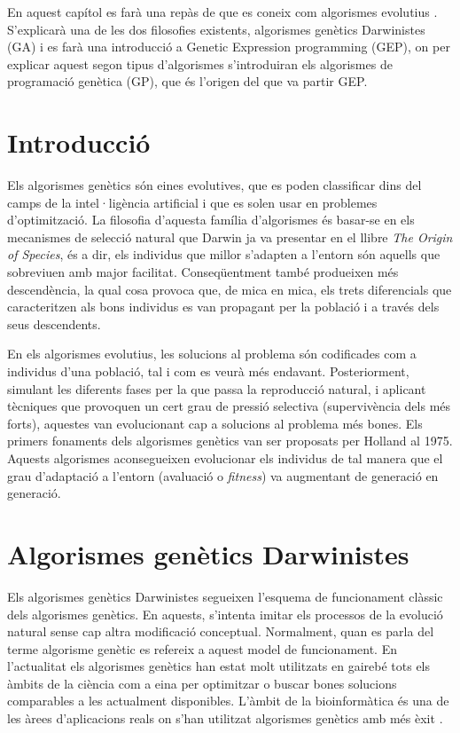 %


En aquest capítol es farà una repàs de que es coneix com algorismes evolutius
\cite{H75}. S'explicarà una de les dos filosofies existents,
algorismes genètics Darwinistes (GA) i es farà una introducció a Genetic
Expression programming (GEP), on per explicar aquest segon tipus d'algorismes
s'introduiran els algorismes de programació genètica (GP), que és l'origen del
que va partir GEP.

\section{Introducció}
Els algorismes genètics són eines evolutives, que es poden
classificar dins del camps de la intel·ligència artificial i que es solen usar
en problemes d'optimització. La filosofia d'aquesta família d'algorismes és
basar-se en els mecanismes de selecció natural que Darwin ja va presentar en el
llibre \emph{The Origin of Species}, és a dir, els individus que millor
s'adapten a l'entorn són aquells que sobreviuen amb major facilitat.
Conseqüentment també produeixen més descendència, la qual cosa provoca que, de
mica en mica, els trets diferencials que caracteritzen als bons individus es van
propagant per la població i a través dels seus descendents.

En els algorismes evolutius, les solucions al problema són codificades com a
individus d'una població, tal i com es veurà més endavant.  Posteriorment,
simulant les diferents fases per la que passa la reproducció natural, i aplicant
tècniques que provoquen un cert grau de pressió selectiva (supervivència dels
més forts), aquestes van evolucionant cap a solucions al problema més bones.
Els primers fonaments dels algorismes genètics van ser proposats per Holland \cite{H75} al 1975.
Aquests algorismes aconsegueixen evolucionar els individus de tal manera que el
grau d'adaptació a l'entorn (avaluació o \emph{fitness}) va augmentant de
generació en generació.

\section{Algorismes genètics Darwinistes}

Els algorismes genètics Darwinistes segueixen l'esquema de funcionament clàssic
dels algorismes genètics. En aquests, s'intenta imitar els processos de la
evolució natural sense cap altra modificació conceptual.  Normalment, quan es
parla del terme algorisme genètic es refereix a aquest model de
funcionament. En l'actualitat els algorismes genètics han estat molt utilitzats
en gairebé tots els àmbits de la ciència com a eina per optimitzar o buscar
bones solucions comparables a les actualment disponibles.  L'àmbit de la
bioinformàtica és una de les àrees d'aplicacions reals on s'han utilitzat algorismes genètics amb
més èxit \cite{PSBE01,D96,wgl:2000,WWBG95}.


